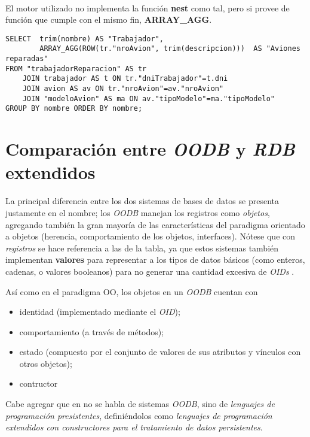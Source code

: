 ~\\

El motor utilizado no implementa la función \textbf{nest} como tal, pero si provee de función que cumple con el mismo fin, \textbf{ARRAY\_AGG}. 

\clearpage   

\vspace*{5mm}
\lstset{style=sql}
\begin{lstlisting}
SELECT  trim(nombre) AS "Trabajador", 
        ARRAY_AGG(ROW(tr."nroAvion", trim(descripcion)))  AS "Aviones reparadas"
FROM "trabajadorReparacion" AS tr 
    JOIN trabajador AS t ON tr."dniTrabajador"=t.dni 
    JOIN avion AS av ON tr."nroAvion"=av."nroAvion" 
    JOIN "modeloAvion" AS ma ON av."tipoModelo"=ma."tipoModelo" 
GROUP BY nombre ORDER BY nombre;
\end{lstlisting}



\section{Comparación entre \emph{OODB} y \emph{RDB} extendidos}

La principal diferencia entre los dos sistemas de bases de datos se presenta justamente en el nombre; los \emph{OODB} manejan los registros  como \emph{objetos}, agregando también la gran mayoría de las características del paradigma orientado a objetos (herencia, comportamiento de los objetos, interfaces). Nótese que con \emph{registros} se hace referencia a las  de la tabla, ya que estos sistemas también implementan \textbf{valores} para representar a los tipos de datos básicos (como enteros, cadenas, o valores booleanos) para no generar una cantidad excesiva de \emph{OIDs} \autocite{elmasri}.

Así como en el paradigma OO, los objetos en un \emph{OODB} cuentan con
\begin{itemize}
    \item identidad (implementado mediante el \emph{OID});
    \item comportamiento (a través de métodos);
    \item estado (compuesto por el conjunto de valores de sus atributos y vínculos con otros objetos);
    \item contructor
\end{itemize}

Cabe agregar que en \autocite{silberschatz} no se habla de sistemas \emph{OODB}, sino de \emph{lenguajes de programación presistentes}, definiéndolos como \emph{lenguajes de programación extendidos con constructores para el tratamiento de datos persistentes}.

